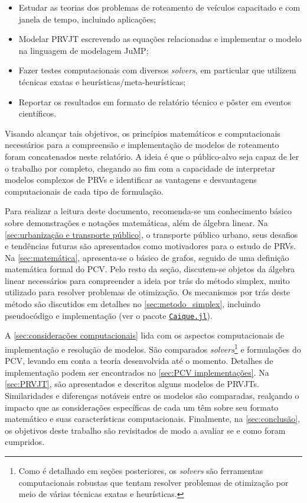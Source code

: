 \begin{itemize}
    \item Estudar as teorias dos problemas de roteamento de veículos capacitado e com janela de tempo, incluindo aplicações;
    \item Modelar PRVJT escrevendo as equações relacionadas e implementar o modelo na linguagem de modelagem JuMP;
    \item Fazer testes computacionais com diversos \emph{solvers}, em particular que utilizem técnicas exatas e heurísticas/meta-heurísticas;
    \item Reportar os resultados em formato de relatório técnico e pôster em eventos científicos.
\end{itemize}

Visando alcançar tais objetivos, os princípios matemáticos e computacionais necessários para a compreensão e implementação de modelos de roteamento foram concatenados neste relatório. A ideia é que o público-alvo seja capaz de ler o trabalho por completo, chegando ao fim com a capacidade de interpretar modelos complexos de PRVs e identificar as vantagens e desvantagens computacionais de cada tipo de formulação.

Para realizar a leitura deste documento, recomenda-se um conhecimento básico sobre demonstrações e notações matemáticas, além de álgebra linear. Na \cref{sec:urbanização e transporte público}, o transporte público urbano, seus desafios e tendências futuras são apresentados como motivadores para o estudo de PRVs. Na \cref{sec:matemática}, apresenta-se o básico de grafos, seguido de uma definição matemática formal do PCV. Pelo resto da seção, discutem-se objetos da álgebra linear necessários para compreender a ideia por trás do método simplex, muito utilizado para resolver problemas de otimização. Os mecanismos por trás deste método são discutidos em detalhes no \cref{sec:metodo_simplex}, incluindo pseudocódigo e implementação \cite{Centenaro:23} (ver o pacote \href{https://github.com/phcentenaro7/Caique.jl}{\texttt{Caique.jl}}).

A \cref{sec:considerações computacionais} lida com os aspectos computacionais de implementação e resolução de modelos. São comparados \emph{solvers}\footnote{Como é detalhado em seções posteriores, os \emph{solvers} são ferramentas computacionais robustas que tentam resolver problemas de otimização por meio de várias técnicas exatas e heurísticas.} e formulações do PCV, levando em conta a teoria desenvolvida até o momento. Detalhes de implementação podem ser encontrados no \cref{sec:PCV implementações}. Na \cref{sec:PRVJT}, são apresentados e descritos alguns modelos de PRVJTs. Similaridades e diferenças notáveis entre os modelos são comparadas, realçando o impacto que as considerações específicas de cada um têm sobre seu formato matemático e suas características computacionais. Finalmente, na \cref{sec:conclusão}, os objetivos deste trabalho são revisitados de modo a avaliar se e como foram cumpridos.